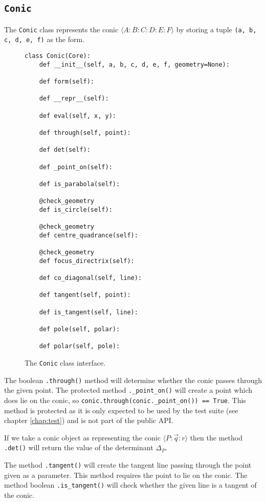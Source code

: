 \subsection{\texttt{Conic}}

The \texttt{Conic} class represents the conic $\langle A\!:\!B\!:\!C\!:\!D\!:\!E\!:\!F\rangle$ by storing a tuple \texttt{(a, b, c, d, e, f)} as the form.


\begin{figure}[hbt!]
\begin{verbatim}
class Conic(Core):
    def __init__(self, a, b, c, d, e, f, geometry=None):
    
    def form(self):

    def __repr__(self):

    def eval(self, x, y):

    def through(self, point):

    def det(self):

    def _point_on(self):

    def is_parabola(self):

    @check_geometry
    def is_circle(self):

    @check_geometry
    def centre_quadrance(self):

    @check_geometry
    def focus_directrix(self):

    def co_diagonal(self, line):

    def tangent(self, point):

    def is_tangent(self, line):
    
    def pole(self, polar):

    def polar(self, pole):
\end{verbatim}
\caption{The \texttt{Conic} class interface.}\label{fig:conic}
\end{figure}

The boolean \texttt{.through()} method will determine whether the conic passes through the given point.
The protected method \texttt{.\_point\_on()} will create a point which does lie on the conic, so \texttt{conic.through(conic.\_point\_on()) == True}.
This method is protected as it is only expected to be used by the test suite (see chapter \ref{chap:test}) and is not part of the public API.

If we take a conic object as representing the conic $\langle P\!:\!\vec{q}\!:\!r\rangle$ then the method \texttt{.det()} will return the value of the determinant $\Delta_P$.

The method \texttt{.tangent()} will create the tangent line passing through the point given as a parameter.
This method requires the point to lie on the conic.
The method boolean \texttt{.is\_tangent()} will check whether the given line is a tangent of the conic.


